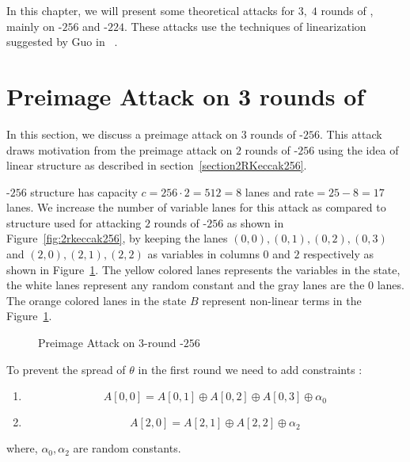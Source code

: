 In this chapter, we will present some theoretical attacks for $3,\;4$ rounds of \KECCAK{}, mainly on \KECCAK{}-$256$ and \KECCAK{}-$224$. These attacks use the techniques of linearization suggested by Guo \etal in ~\cite{guo2016linear}.

\section{Preimage Attack on 3 rounds of }
In this section, we discuss a preimage attack on $3$ rounds of \KECCAK-$256$. This attack draws motivation from the preimage attack on $2$ rounds of \Keccak-$256$ using the idea of linear structure as described in section~\ref{section2RKeccak256}.

\Keccak-$256$ structure has capacity $c = 256 \cdot 2 = 512 = 8$ lanes and rate$ =  25 - 8 = 17$ lanes. We increase the number of variable lanes for this attack as compared to structure used for attacking $2$ rounds of \Keccak-$256$ as shown in Figure~\ref{fig:2rkeccak256}, by keeping the lanes $(0,0), (0,1), (0,2), (0,3)$ and $(2,0), (2,1), (2,2)$ as variables in columns $0$ and $2$ respectively as shown in Figure~\ref{fig:3rkeccak256}. The yellow colored lanes represents the variables in the state, the white lanes represent any random constant and the gray lanes are the $0$ lanes. The orange colored lanes in the state $B$ represent non-linear terms in the Figure~\ref{fig:3rkeccak256}.

\begin{figure}[H]
        \centering
        \caption{Preimage Attack on $3$-round \KECCAK-$256$}
        \label{fig:3rkeccak256}
\end{figure}

To prevent the spread of $\theta$ in the first round we need to add constraints :
\begin{enumerate}
\item \[
        A[0,0] = A[0,1] \oplus A[0,2] \oplus A[0,3] \oplus \alpha_0
    \]
\item \[
        A[2,0] = A[2,1] \oplus A[2,2] \oplus \alpha_2
    \]
\end{enumerate}
where, $\alpha_0, \alpha_2$ are random constants.

